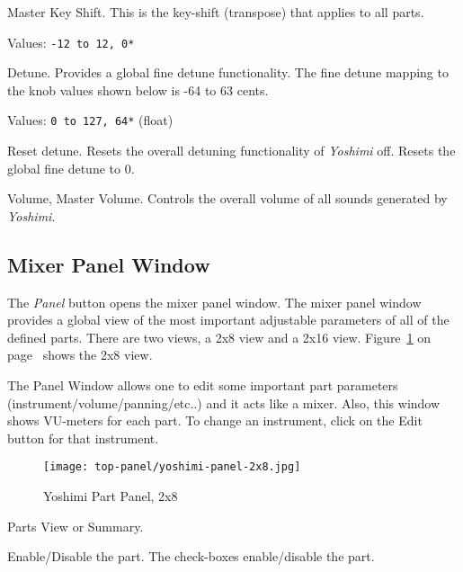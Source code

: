    Master Key Shift.
   This is the key-shift (transpose) that applies to all parts.

   Values: \texttt{-12 to 12, 0*}

   Detune.  Provides a global fine detune functionality.
   The fine detune mapping to the knob values shown below is
   -64 to 63 cents.

   Values: \texttt{0 to 127, 64*} (float)

   Reset detune.
   Resets the overall detuning functionality of 
   \textsl{Yoshimi} off.
   Resets the global fine detune to 0.

   Volume, Master Volume.
   Controls the overall volume of all sounds generated by
   \textsl{Yoshimi}.

\subsection{Mixer Panel Window}
\label{subsec:mixer_panel_window}

   The \textsl{Panel} button opens the mixer panel window.
   The mixer panel window provides a global view of the most important
   adjustable parameters of all of the defined parts.
   There are two views, a 2x8 view and a 2x16 view.
   Figure~\ref{fig:yoshimi_part_panel_2x8} on
   page~\pageref{fig:yoshimi_part_panel_2x8}
   shows the 2x8 view.

   The Panel Window allows one to edit some important part parameters
   (instrument/volume/panning/etc..) and it acts like a mixer. Also, this
   window shows VU-meters for each part.  To change an instrument, click on
   the Edit button for that instrument.

\begin{figure}[H]
   \centering 
   \texttt{[image: top-panel/yoshimi-panel-2x8.jpg]}
   \caption[Yoshimi Part Panel]{Yoshimi Part Panel, 2x8}
   \label{fig:yoshimi_part_panel_2x8}
\end{figure}

   \setcounter{ItemCounter}{0}      %

   Parts View or Summary.

   Enable/Disable the part. The check-boxes enable/disable the part.

